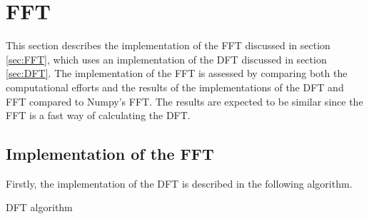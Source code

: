 \section{FFT}
This section describes the implementation of the FFT discussed in section \ref{sec:FFT}, which uses an implementation of the DFT discussed in section \ref{sec:DFT}. The implementation of the FFT is assessed by comparing both the computational efforts and the results of the implementations of the DFT and FFT compared to Numpy's FFT. The results are expected to be similar since the FFT is a fast way of calculating the DFT.

\subsection{Implementation of the FFT}
Firstly, the implementation of the DFT is described in the following algorithm.
\begin{algorithm}
\caption{DFT algorithm}
\label{DFTalg}
\begin{algorithmic}[1]
		 
		\EndFor
	\EndFor
\EndProcedure
\end{algorithmic}
\end{algorithm}

